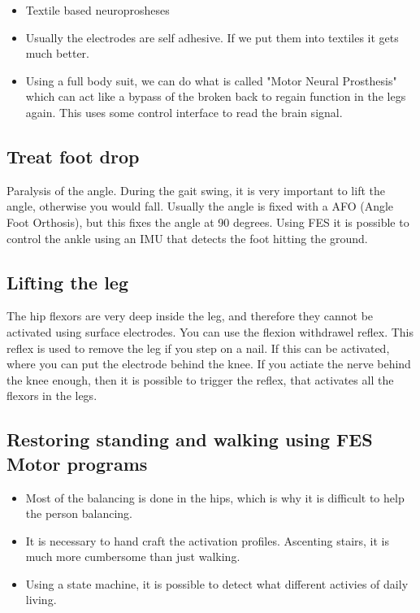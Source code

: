 \documentclass[a4paper]{article}
\begin{document}
\begin{itemize}
	\item Textile based neuroprosheses
	\item Usually the electrodes are self adhesive. If we put them into textiles it gets much better. 
	\item Using a full body suit, we can do what is called "Motor Neural Prosthesis" which can act like a bypass of the broken back to regain function in the legs again. This uses some control interface to read the brain signal. 
\end{itemize}


\subsection{Treat foot drop}
Paralysis of the angle. During the gait swing, it is very important to lift the angle, otherwise you would fall. Usually the angle is fixed with a AFO (Angle Foot Orthosis), but this fixes the angle at 90 degrees. Using FES it is possible to control the ankle using an IMU that detects the foot hitting the ground.

\subsection{Lifting the leg}
The hip flexors are very deep inside the leg, and therefore they cannot be activated using surface electrodes. You can use the flexion withdrawel reflex. This reflex is used to remove the leg if you step on a nail. If this can be activated, where you can put the electrode behind the knee. If you actiate the nerve behind the knee enough, then it is possible to trigger the reflex, that activates all the flexors in the legs. 


\subsection{Restoring standing and walking using FES Motor programs}
\begin{itemize}
	\item Most of the balancing is done in the hips, which is why it is difficult to help the person balancing. 
	\item It is necessary to hand craft the activation profiles. Ascenting stairs, it is much more cumbersome than just walking.
	\item Using a state machine, it is possible to detect what different activies of daily living.
\end{itemize}
\end{document}

